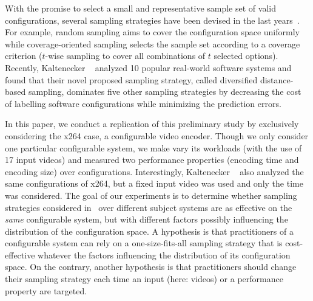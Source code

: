 With the promise to select a small and representative sample set of valid configurations, several sampling strategies have been devised in the last years~\cite{julianasurvey}.
 For example, random sampling aims to cover the configuration
space uniformly while coverage-oriented sampling selects the sample set according to a coverage criterion (\eg $t$-wise sampling to cover all combinations of $t$ selected options).
 Recently, Kaltenecker \etal~\cite{kaltenecker2019} analyzed 10 popular real-world software systems and found that their novel proposed sampling strategy, called diversified distance-based sampling, dominates five other sampling strategies by decreasing the cost of labelling software configurations while minimizing the prediction errors.

In this paper, we conduct a replication of this preliminary study by exclusively considering the x264 case, a configurable video encoder. Though we only consider one particular configurable system, we make vary its workloads (with the use of 17 input videos) and measured two performance properties (encoding time and encoding size) over \nbconfigurations\xspace configurations.  
Interestingly, Kaltenecker \etal~\cite{kaltenecker2019} also analyzed the same \nbconfigurations\xspace configurations of x264, but a fixed input video was used and only the time was considered. The goal of our experiments is to determine whether sampling strategies considered in~\cite{kaltenecker2019} over different subject systems are as effective on the \emph{same} configurable system, but with different factors possibly influencing the distribution of the configuration space. 
 A hypothesis is that practitioners of a configurable system can rely on a one-size-fits-all sampling strategy that is cost-effective whatever the factors influencing the distribution of its configuration space.  
On the contrary, another hypothesis is that practitioners should change their sampling strategy each time an input (here: videos) or a performance property are targeted.  


